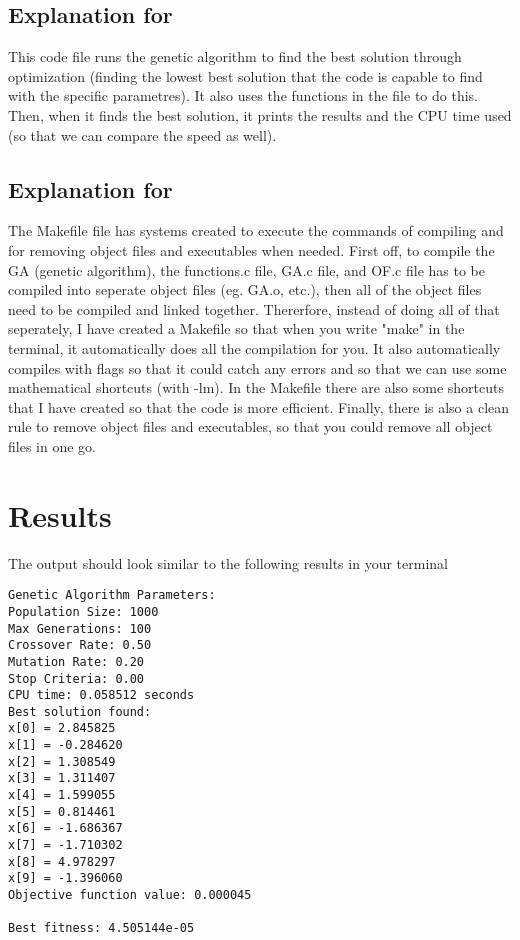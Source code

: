 \documentclass[12pt]{article}
\begin{document}
 \subsection{Explanation for }
 This code file runs the genetic algorithm to find the best solution through optimization (finding the lowest best solution that the code is capable to find with the specific parametres). It also uses the functions in the  file to do this. Then, when it finds the best solution, it prints the results and the CPU time used (so that we can compare the speed as well).
 \subsection{Explanation for }
 The Makefile file has systems created to execute the commands of compiling and for removing object files and executables when needed. First off, to compile the GA (genetic algorithm), the functions.c file, GA.c file, and OF.c file has to be compiled into seperate object files (eg. GA.o, etc.), then all of the object files need to be compiled and linked together. Thererfore, instead of doing all of that seperately, I have created a Makefile so that when you write "make" in the terminal, it automatically does all the compilation for you. It also automatically compiles with flags so that it could catch any errors and so that we can use some mathematical shortcuts (with -lm). In the Makefile there are also some shortcuts that I have created so that the code is more efficient. Finally, there is also a clean rule to remove object files and executables, so that you could remove all object files in one go.
	
	
	\section{Results}
	
	The output should look similar to the following results in your terminal
	
	
	\begin{mdframed}[style=myboxstyleTerminal1]
		\footnotesize
		\begin{verbatim}
Genetic Algorithm Parameters:
Population Size: 1000
Max Generations: 100
Crossover Rate: 0.50
Mutation Rate: 0.20
Stop Criteria: 0.00
CPU time: 0.058512 seconds
Best solution found:
x[0] = 2.845825
x[1] = -0.284620
x[2] = 1.308549
x[3] = 1.311407
x[4] = 1.599055
x[5] = 0.814461
x[6] = -1.686367
x[7] = -1.710302
x[8] = 4.978297
x[9] = -1.396060
Objective function value: 0.000045

Best fitness: 4.505144e-05
		\end{verbatim}
	\end{mdframed}
\end{document}
